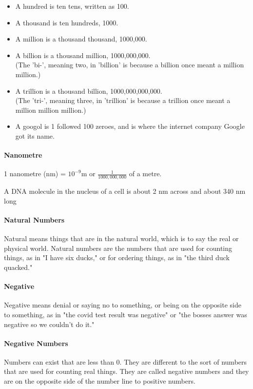 \documentclass[12pt]{article}
\begin{document}
{\begin{itemize}
\item A hundred is ten tens, written as 100.
\item A thousand is ten hundreds, 1000.
\item A million is a thousand thousand, 1000,000.
\item A billion is a thousand million, 1000,000,000.\\
(The 'bi-', meaning two, in 'billion' is because a billion once meant a million million.)
\item A trillion is a thousand billion, 1000,000,000,000.\\
(The 'tri-', meaning three, in 'trillion' is because a trillion once meant a million million million.)
\item A googol is 1 followed 100 zeroes, and is where the internet company Google got its name.
\end{itemize}

\paragraph{Nanometre} 1 nanometre (nm) = $10^{-9}$m or $\frac{1}{1000,000,000}$ of a metre.

A DNA molecule in the nucleus of a cell is about 2 nm across and about 340 nm long

\paragraph{Natural Numbers}
Natural means things that are in the natural world, which is to say the real or physical world. Natural numbers are the numbers that are used for counting things, as in "I have six ducks," or for ordering things, as in "the third duck quacked."

\paragraph{Negative}
Negative means denial or saying no to something, or being on the opposite side to something, as in "the covid test result was negative" or "the bosses answer was negative so we couldn't do it."

\paragraph{Negative Numbers}
Numbers can exist that are less than 0. They are different to the sort of numbers that are used for counting real things. They are called negative numbers and they are on the opposite side of the number line to positive numbers.

}
\end{document}
